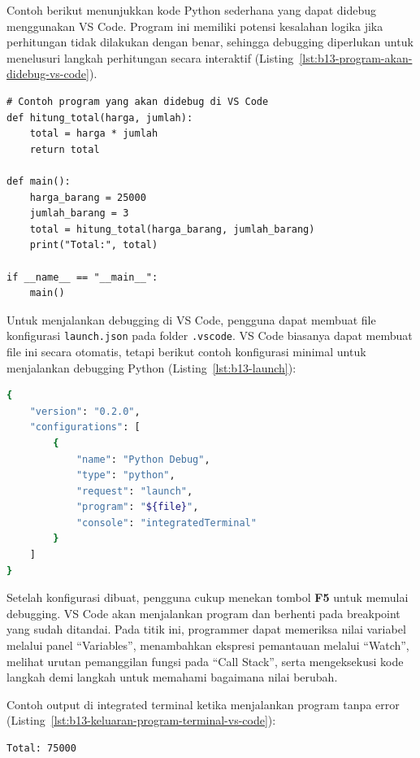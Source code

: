 Contoh berikut menunjukkan kode Python sederhana yang dapat didebug menggunakan VS Code. Program ini memiliki potensi kesalahan logika jika perhitungan tidak dilakukan dengan benar, sehingga debugging diperlukan untuk menelusuri langkah perhitungan secara interaktif (Listing~\ref{lst:b13-program-akan-didebug-vs-code}).

\begin{lstlisting}[style=PythonStyle, caption={Contoh program yang akan didebug di VS Code}, label={lst:b13-program-akan-didebug-vs-code}]
# Contoh program yang akan didebug di VS Code
def hitung_total(harga, jumlah):
    total = harga * jumlah
    return total

def main():
    harga_barang = 25000
    jumlah_barang = 3
    total = hitung_total(harga_barang, jumlah_barang)
    print("Total:", total)

if __name__ == "__main__":
    main()
\end{lstlisting}

Untuk menjalankan debugging di VS Code, pengguna dapat membuat file konfigurasi \texttt{launch.json} pada folder \texttt{.vscode}. VS Code biasanya dapat membuat file ini secara otomatis, tetapi berikut contoh konfigurasi minimal untuk menjalankan debugging Python (Listing~\ref{lst:b13-launch}):

\begin{lstlisting}[language=bash, caption={Konfigurasi launch.json}, label={lst:b13-launch}]
{
    "version": "0.2.0",
    "configurations": [
        {
            "name": "Python Debug",
            "type": "python",
            "request": "launch",
            "program": "${file}",
            "console": "integratedTerminal"
        }
    ]
}
\end{lstlisting}

Setelah konfigurasi dibuat, pengguna cukup menekan tombol \textbf{F5} untuk memulai debugging. VS Code akan menjalankan program dan berhenti pada breakpoint yang sudah ditandai. Pada titik ini, programmer dapat memeriksa nilai variabel melalui panel “Variables”, menambahkan ekspresi pemantauan melalui “Watch”, melihat urutan pemanggilan fungsi pada “Call Stack”, serta mengeksekusi kode langkah demi langkah untuk memahami bagaimana nilai berubah.

Contoh output di integrated terminal ketika menjalankan program tanpa error (Listing~\ref{lst:b13-keluaran-program-terminal-vs-code}):

\begin{lstlisting}[language=bash, caption={Keluaran program di terminal VS Code}, label={lst:b13-keluaran-program-terminal-vs-code}]
Total: 75000
\end{lstlisting}

